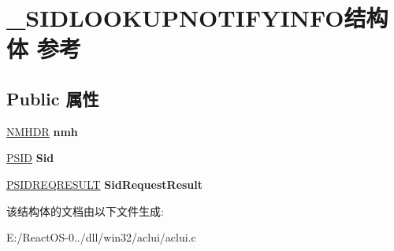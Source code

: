\hypertarget{struct___s_i_d_l_o_o_k_u_p_n_o_t_i_f_y_i_n_f_o}{}\section{\+\_\+\+S\+I\+D\+L\+O\+O\+K\+U\+P\+N\+O\+T\+I\+F\+Y\+I\+N\+F\+O结构体 参考}
\label{struct___s_i_d_l_o_o_k_u_p_n_o_t_i_f_y_i_n_f_o}
\subsection*{Public 属性}
\begin{DoxyCompactItemize}
\item 
\mbox{\label{struct___s_i_d_l_o_o_k_u_p_n_o_t_i_f_y_i_n_f_o_ae9a3530a5f5618645cf5e950a4d70a61}} 
\hyperlink{structtag_n_m_h_d_r}{N\+M\+H\+DR} {\bfseries nmh}
\item 
\mbox{\label{struct___s_i_d_l_o_o_k_u_p_n_o_t_i_f_y_i_n_f_o_a2916cc649948866490843d7bef36a92b}} 
\hyperlink{struct___s_i_d}{P\+S\+ID} {\bfseries Sid}
\item 
\mbox{\label{struct___s_i_d_l_o_o_k_u_p_n_o_t_i_f_y_i_n_f_o_afff67311a88860c5085cedadaf36f78b}} 
\hyperlink{struct___s_i_d_r_e_q_r_e_s_u_l_t}{P\+S\+I\+D\+R\+E\+Q\+R\+E\+S\+U\+LT} {\bfseries Sid\+Request\+Result}
\end{DoxyCompactItemize}


该结构体的文档由以下文件生成\+:\begin{DoxyCompactItemize}
\item 
E\+:/\+React\+O\+S-\/0../dll/win32/aclui/aclui.\+c\end{DoxyCompactItemize}
